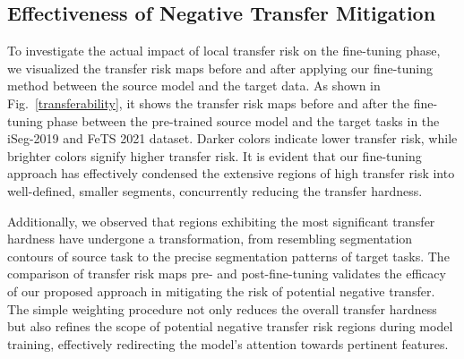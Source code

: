 \subsection{Effectiveness of Negative Transfer Mitigation}
To investigate the actual impact of local transfer risk on the fine-tuning phase, we visualized the transfer risk maps before and after applying our fine-tuning method between the source model and the target data. As shown in Fig.~\ref{transferability}, it shows the transfer risk maps before and after the fine-tuning phase between the pre-trained source model and the target tasks in the iSeg-2019 and FeTS 2021 dataset. Darker colors indicate lower transfer risk, while brighter colors signify higher transfer risk. It is evident that our fine-tuning approach has effectively condensed the extensive regions of high transfer risk into well-defined, smaller segments, concurrently reducing the transfer hardness.

Additionally, we observed that regions exhibiting the most significant transfer hardness have undergone a transformation, from resembling segmentation contours of source task to the precise segmentation patterns of target tasks. The comparison of transfer risk maps pre- and post-fine-tuning validates the efficacy of our proposed approach in mitigating the risk of potential negative transfer. The simple weighting procedure not only reduces the overall transfer hardness but also refines the scope of potential negative transfer risk regions during model training, effectively redirecting the model's attention towards pertinent features.